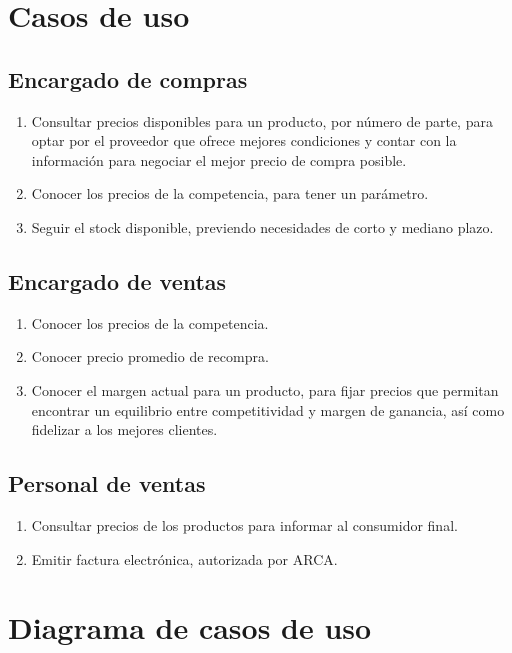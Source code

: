 
\section{Casos de uso}

\subsection*{Encargado de compras}
\begin{enumerate}
	\item Consultar precios disponibles para un producto, 
	por número de parte,
	para optar por el proveedor que ofrece mejores condiciones
	y contar con la información para negociar el mejor precio de compra posible.
	\item Conocer los precios de la competencia,
	para tener un parámetro.
	\item Seguir el stock disponible,
	previendo necesidades de corto y mediano plazo.
\end{enumerate}

\subsection*{Encargado de ventas}
\begin{enumerate}
	\item Conocer los precios de la competencia.
	\item Conocer precio promedio de recompra.
	\item Conocer el margen actual para un producto,
	para fijar precios que permitan encontrar un equilibrio entre competitividad y margen de ganancia,
	así como fidelizar a los mejores clientes.
\end{enumerate}

\subsection*{Personal de ventas}
\begin{enumerate}
	\item Consultar precios de los productos para informar al consumidor final.
	\item Emitir factura electrónica,
	autorizada por ARCA.
\end{enumerate}

\section{Diagrama de casos de uso}

